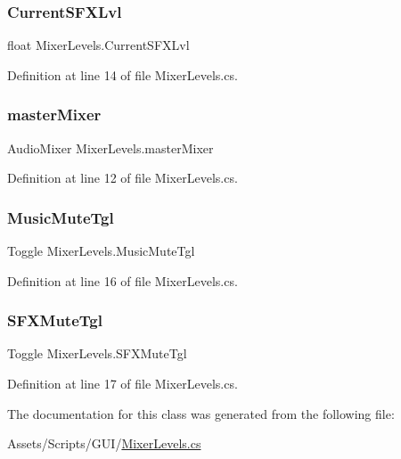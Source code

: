 \mbox{\label{class_mixer_levels_a8623b0c2dd656d2fd263b9859d339bd0}} 
\subsubsection{\texorpdfstring{Current\+S\+F\+X\+Lvl}{CurrentSFXLvl}}
{\footnotesize\ttfamily float Mixer\+Levels.\+Current\+S\+F\+X\+Lvl}



Definition at line 14 of file Mixer\+Levels.\+cs.

\mbox{\label{class_mixer_levels_a1ca57f242f0eb3070859f9221d81dc19}} 
\subsubsection{\texorpdfstring{master\+Mixer}{masterMixer}}
{\footnotesize\ttfamily Audio\+Mixer Mixer\+Levels.\+master\+Mixer}



Definition at line 12 of file Mixer\+Levels.\+cs.

\mbox{\label{class_mixer_levels_abfddb3c0ae4ff4dab3690c634505ae14}} 
\subsubsection{\texorpdfstring{Music\+Mute\+Tgl}{MusicMuteTgl}}
{\footnotesize\ttfamily Toggle Mixer\+Levels.\+Music\+Mute\+Tgl}



Definition at line 16 of file Mixer\+Levels.\+cs.

\mbox{\label{class_mixer_levels_acb34a709a53713a45cb437d81273b628}} 
\subsubsection{\texorpdfstring{S\+F\+X\+Mute\+Tgl}{SFXMuteTgl}}
{\footnotesize\ttfamily Toggle Mixer\+Levels.\+S\+F\+X\+Mute\+Tgl}



Definition at line 17 of file Mixer\+Levels.\+cs.



The documentation for this class was generated from the following file\+:\begin{DoxyCompactItemize}
\item 
Assets/\+Scripts/\+G\+U\+I/\mbox{\hyperlink{_mixer_levels_8cs}{Mixer\+Levels.\+cs}}\end{DoxyCompactItemize}
